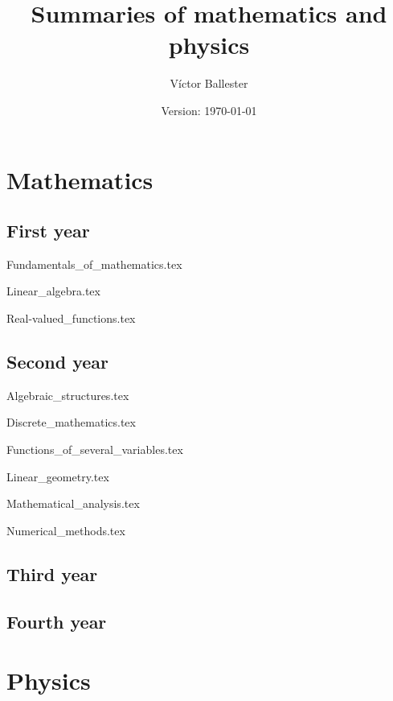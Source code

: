 \documentclass{report}
\title{Summaries of mathematics and physics}
\author{Víctor Ballester}
\date{Version: \today}
\begin{document}
\maketitle
\newpage
\tableofcontents
\newpage
\part{Mathematics}
    \chapter{First year}
        {Fundamentals_of_mathematics.tex}
        \cleardoublepage    
    
        {Linear_algebra.tex}
        \cleardoublepage
        
        {Real-valued_functions.tex}
        \cleardoublepage
    \chapter{Second year}
        {Algebraic_structures.tex}
        \cleardoublepage
        
        {Discrete_mathematics.tex}
        \cleardoublepage
        
        {Functions_of_several_variables.tex}
        \cleardoublepage
        
        {Linear_geometry.tex}
        \cleardoublepage
        
        {Mathematical_analysis.tex}
        \cleardoublepage
        
        {Numerical_methods.tex}
        \cleardoublepage
    \chapter{Third year}
    \chapter{Fourth year}
\part{Physics}
\end{document}
